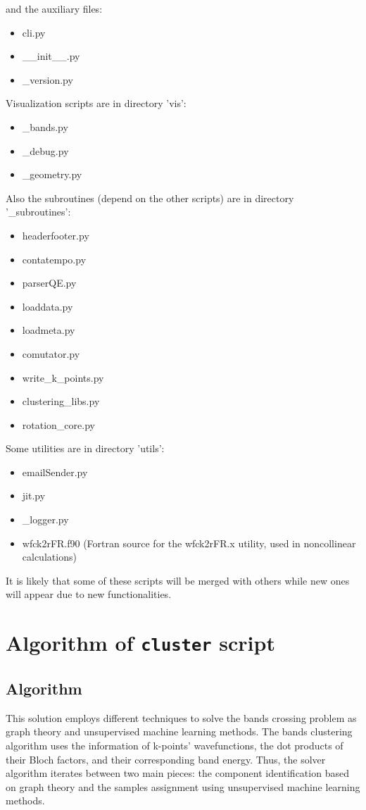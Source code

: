 \documentclass[a4paper,12pt]{report}
\begin{document}
\begin{appendices}
and the auxiliary files:
\begin{itemize}
  \item cli.py
  \item \_\_init\_\_.py
  \item \_version.py
\end{itemize}\medskip


Visualization scripts are in directory 'vis':
\begin{itemize}
 \item \_bands.py
 \item \_debug.py
 \item \_geometry.py
\end{itemize}\medskip

Also the subroutines (depend on the other scripts) are in directory '\_subroutines':
\begin{itemize}
 \item headerfooter.py
 \item contatempo.py
 \item parserQE.py
 \item loaddata.py
 \item loadmeta.py
 \item comutator.py
 \item write\_k\_points.py
 \item clustering\_libs.py
 \item rotation\_core.py
\end{itemize}

Some utilities are in directory 'utils':
\begin{itemize}
  \item emailSender.py
  \item jit.py
  \item \_logger.py
  \item wfck2rFR.f90 (Fortran source for the wfck2rFR.x utility, used in noncollinear calculations)
\end{itemize}

It is likely that some of these scripts will be merged with others
while new ones will appear due to new functionalities.






\chapter{Algorithm of \texttt{cluster} script}
\label{cha:cluster}


    \section{Algorithm}
    This solution employs different techniques to solve the bands crossing problem as graph theory and unsupervised machine learning methods.
    The bands clustering algorithm uses the information of k-points' wavefunctions, the dot products of their Bloch factors, and their corresponding band energy.
    Thus, the solver algorithm iterates between two main pieces: the component identification based on graph theory and the samples assignment using unsupervised machine learning methods.


\end{appendices}
\end{document}
